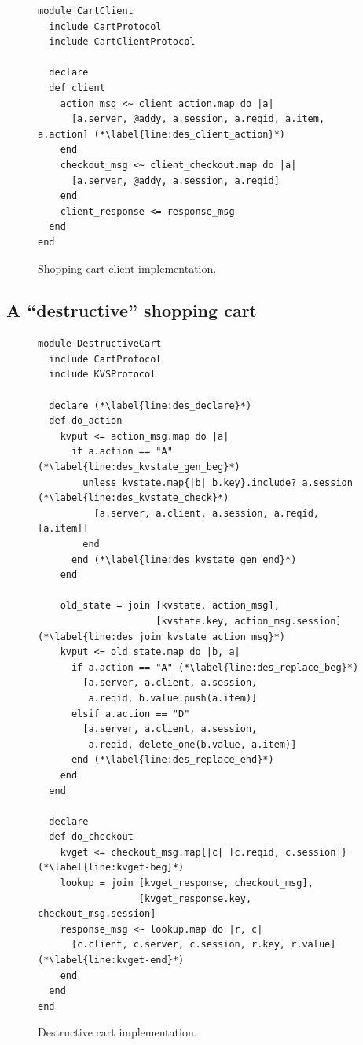 \begin{figure}[t]
\begin{scriptsize}
\begin{lstlisting}
module CartClient
  include CartProtocol
  include CartClientProtocol

  declare
  def client
    action_msg <~ client_action.map do |a| 
      [a.server, @addy, a.session, a.reqid, a.item, a.action] (*\label{line:des_client_action}*)
    end
    checkout_msg <~ client_checkout.map do |a| 
      [a.server, @addy, a.session, a.reqid]
    end
    client_response <= response_msg
  end
end
\end{lstlisting}
\vspace{-10pt}
\caption{Shopping cart client implementation.}
\label{fig:cart_client}
\end{scriptsize}
\vspace{-2pt}
\end{figure}

\subsection{A ``destructive'' shopping cart}

\begin{figure}[t]
\begin{scriptsize}
\begin{lstlisting}
module DestructiveCart
  include CartProtocol
  include KVSProtocol

  declare (*\label{line:des_declare}*)
  def do_action
    kvput <= action_msg.map do |a|
      if a.action == "A" (*\label{line:des_kvstate_gen_beg}*)
        unless kvstate.map{|b| b.key}.include? a.session (*\label{line:des_kvstate_check}*)
          [a.server, a.client, a.session, a.reqid, [a.item]]
        end
      end (*\label{line:des_kvstate_gen_end}*)
    end

    old_state = join [kvstate, action_msg],
                     [kvstate.key, action_msg.session]  (*\label{line:des_join_kvstate_action_msg}*)
    kvput <= old_state.map do |b, a|
      if a.action == "A" (*\label{line:des_replace_beg}*)
        [a.server, a.client, a.session, 
         a.reqid, b.value.push(a.item)]
      elsif a.action == "D"
        [a.server, a.client, a.session, 
         a.reqid, delete_one(b.value, a.item)]
      end (*\label{line:des_replace_end}*)
    end
  end

  declare
  def do_checkout
    kvget <= checkout_msg.map{|c| [c.reqid, c.session]} (*\label{line:kvget-beg}*)
    lookup = join [kvget_response, checkout_msg],
                  [kvget_response.key, checkout_msg.session]
    response_msg <~ lookup.map do |r, c|
      [c.client, c.server, c.session, r.key, r.value] (*\label{line:kvget-end}*)
    end
  end
end
\end{lstlisting}
\vspace{-10pt}
\caption{Destructive cart implementation.}
\label{fig:dest-cart}
\end{scriptsize}
\vspace{-2pt}
\end{figure}

